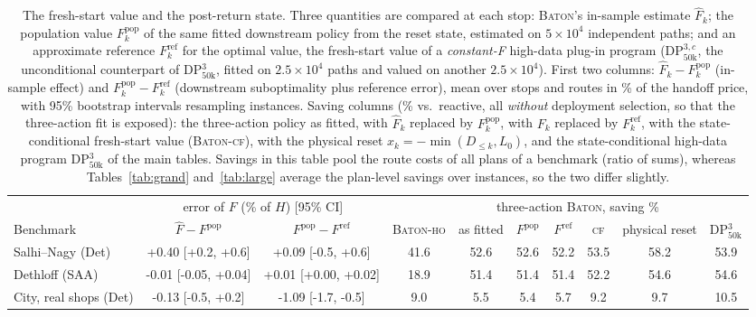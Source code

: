 \begin{table}[t]
\caption{The fresh-start value and the post-return state. Three quantities
are compared at each stop: \textsc{Baton}'s in-sample estimate
$\widehat F_k$; the population value $F^{\mathrm{pop}}_k$ of the same
fitted downstream policy from the reset state, estimated on
$5\times10^4$ independent paths; and an approximate reference
$F^{\mathrm{ref}}_k$ for the optimal value, the fresh-start value of a
\emph{constant-F} high-data plug-in program (DP$^{3,c}_{50\mathrm{k}}$,
the unconditional counterpart of DP$^3_{50\mathrm{k}}$, fitted on
$2.5\times10^4$ paths and valued on another $2.5\times10^4$). First two
columns: $\widehat F_k - F^{\mathrm{pop}}_k$ (in-sample effect) and
$F^{\mathrm{pop}}_k - F^{\mathrm{ref}}_k$ (downstream suboptimality plus
reference error), mean over stops and routes in \% of the handoff price,
with 95\% bootstrap intervals resampling instances. Saving columns (\%
vs.\ reactive, all \emph{without} deployment selection, so that the
three-action fit is exposed): the three-action policy as fitted, with
$\widehat F_k$ replaced by $F^{\mathrm{pop}}_k$, with $F_k$ replaced by
$F^{\mathrm{ref}}_k$, with the state-conditional fresh-start value
(\textsc{Baton-cf}), with the physical reset $x_k = -\min(D_{\le k},
L_0)$, and the state-conditional high-data program
DP$^3_{50\mathrm{k}}$ of the main tables. Savings in this table
pool the route costs of all plans of a benchmark (ratio of sums), whereas
Tables~\ref{tab:grand} and~\ref{tab:large} average the plan-level
savings over instances, so the two differ slightly.}
\label{tab:fresh}
\centering
\scriptsize
\setlength{\tabcolsep}{2.6pt}
\begin{adjustbox}{max width=\linewidth}
\begin{tabular}{l cc c ccccc c}
\toprule
& \multicolumn{2}{c}{error of $F$ (\% of $H$) [95\% CI]} & & \multicolumn{5}{c}{three-action \textsc{Baton}, saving \%} & \\ \cmidrule(lr){2-3}\cmidrule(lr){5-9}
Benchmark & $\widehat F - F^{\mathrm{pop}}$ & $F^{\mathrm{pop}} - F^{\mathrm{ref}}$ & \textsc{Baton-ho} & as fitted & $F^{\mathrm{pop}}$ & $F^{\mathrm{ref}}$ & \textsc{cf} & physical reset & DP$^3_{50\mathrm{k}}$ \\
\midrule
Salhi--Nagy (Det) & +0.40 [+0.2, +0.6] & +0.09 [-0.5, +0.6] & 41.6 & 52.6 & 52.6 & 52.2 & 53.5 & 58.2 & 53.9 \\
Dethloff (SAA) & -0.01 [-0.05, +0.04] & +0.01 [+0.00, +0.02] & 18.9 & 51.4 & 51.4 & 51.4 & 52.2 & 54.6 & 54.6 \\
City, real shops (Det) & -0.13 [-0.5, +0.2] & -1.09 [-1.7, -0.5] & 9.0 & 5.5 & 5.4 & 5.7 & 9.2 & 9.7 & 10.5 \\
\bottomrule
\end{tabular}
\end{adjustbox}
\end{table}
